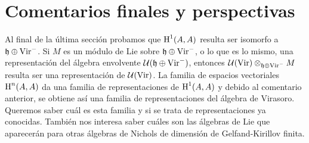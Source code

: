 \documentclass[fleqn,../tesis.tex]{subfiles}
\begin{document}
\section{Comentarios finales y perspectivas}

Al final de la última sección probamos que $\operatorname{H}^{1}(A,A)$ resulta ser isomorfo a $\mathfrak{h} \oplus \operatorname{Vir}^{-}$.
Si $M$ es un módulo de Lie sobre $\mathfrak{h} \oplus \operatorname{Vir}^{-}$, o lo que es lo mismo, una representación del álgebra
envolvente $\mathcal{U}(\mathfrak{h} \oplus \operatorname{Vir}^{-})$, entonces $\mathcal{U}(\operatorname{Vir})\otimes_{\mathfrak{h} \oplus \operatorname{Vir}^{-}} M$
resulta ser una representación de $\mathcal{U}(\operatorname{Vir})$. La familia de espacios vectoriales $\operatorname{H}^{n}(A,A)$
da una familia de representaciones de $\operatorname{H}^{1}(A,A)$ y debido al comentario anterior, se obtiene así una familia de representaciones
del álgebra de Virasoro. Queremos saber cuál es esta familia y si se trata de representaciones ya conocidas.
También nos interesa saber cuáles son las álgebras de Lie que aparecerán para otras álgebras de Nichols de dimensión
de Gelfand-Kirillov finita.
\end{document}
